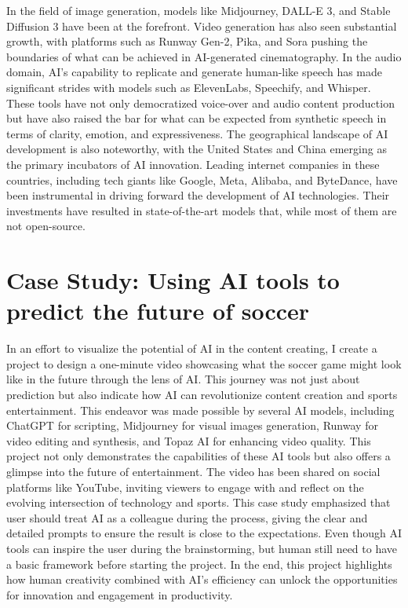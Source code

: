 \documentclass[11pt,a4paper,oneside]{report}
\begin{document}
In the field of image generation, models like Midjourney, DALL-E 3, and Stable Diffusion 3 have been at the forefront. 
Video generation has also seen substantial growth, with platforms such as Runway Gen-2, Pika, and Sora pushing the boundaries of what can be achieved in AI-generated cinematography. 
In the audio domain, AI's capability to replicate and generate human-like speech has made significant strides with models such as ElevenLabs, Speechify, and Whisper. 
These tools have not only democratized voice-over and audio content production but have also raised the bar for what can be expected from synthetic speech in terms of clarity, emotion, and expressiveness. 
The geographical landscape of AI development is also noteworthy, with the United States and China emerging as the primary incubators of AI innovation. 
Leading internet companies in these countries, including tech giants like Google, Meta, Alibaba, and ByteDance, have been instrumental in driving forward the development of AI technologies. 
Their investments have resulted in state-of-the-art models that, while most of them are not open-source.

\section{Case Study: Using AI tools to predict the future of soccer}
In an effort to visualize the potential of AI in the content creating, I create a project to design a one-minute video showcasing what the soccer game might look like in the future through the lens of AI. 
This journey was not just about prediction but also indicate how AI can revolutionize content creation and sports entertainment.
This endeavor was made possible by several AI models, including ChatGPT for scripting, Midjourney for visual images generation, Runway for video editing and synthesis, and Topaz AI for enhancing video quality. 
This project not only demonstrates the capabilities of these AI tools but also offers a glimpse into the future of entertainment. 
The video has been shared on social platforms like YouTube, inviting viewers to engage with and reflect on the evolving intersection of technology and sports.
This case study emphasized that user should treat AI as a colleague during the process, giving the clear and detailed prompts to ensure the result is close to the expectations.
Even though AI tools can inspire the user during the brainstorming, but human still need to have a basic framework before starting the project.
In the end, this project highlights how human creativity combined with AI's efficiency can unlock the opportunities for innovation and engagement in productivity.
\end{document}
